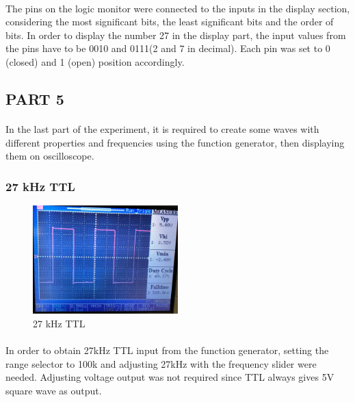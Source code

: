\documentclass[pdftex,12pt,a4paper]{article}
\begin{document}
\paragraph{}
\begin{flushleft}
The pins on the logic monitor were connected to the inputs in the display section, considering the most significant bits, the least significant bits and the order of bits. In order to display the number 27 in the display part, the input values from the pins have to be 0010 and 0111(2 and 7 in decimal). Each pin was set to 0 (closed) and 1 (open) position accordingly.

\end{flushleft}

\begin{flushleft}
\subsection{PART 5}
\end{flushleft}
\begin{flushleft}
\paragraph{}
In the last part of the experiment, it is required to create some waves with different properties and frequencies using the function generator, then displaying them on oscilloscope.

\end{flushleft}

\begin{flushleft}
\subsubsection{27 kHz TTL}
\begin{figure}[h]
    \centering
	\includegraphics[width=0.5\textwidth]{Photos/5_1_closeup.jpg}
	\caption{27 kHz TTL}
	\label{fig4}
\end{figure}

\paragraph{}
In order to obtain 27kHz TTL input from the function generator, setting the range selector to 100k and adjusting 27kHz with the frequency slider were needed. Adjusting voltage output was not required since TTL always gives 5V square wave as output.
\end{flushleft}
\end{document}
